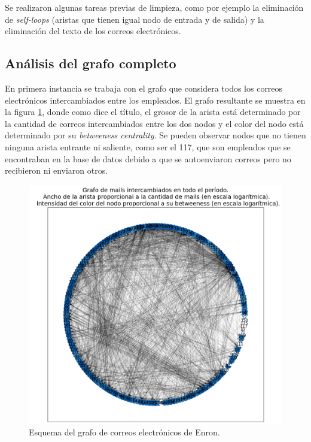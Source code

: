 \documentclass{article}
\begin{document}
Se realizaron algunas tareas previas de limpieza, como por ejemplo la eliminación de \textit{self-loops} (aristas que tienen igual nodo de entrada y de salida) y la eliminación del texto de los correos electrónicos.

\subsection{Análisis del grafo completo}
En primera instancia se trabaja con el grafo que considera todos los correos electrónicos intercambiados entre los empleados. El grafo resultante se muestra en la figura \ref{fig:grafo}, donde como dice el título, el grosor de la arista está determinado por la cantidad de correos intercambiados entre los dos nodos y el color del nodo está determinado por su \textit{betweeness centrality}. Se pueden observar nodos que no tienen ninguna arista entrante ni saliente, como ser el 117, que son empleados que se encontraban en la base de datos debido a que se autoenviaron correos pero no recibieron ni enviaron otros.

\begin{figure}[htb]
    \centering
    \includegraphics[width=0.8\linewidth]{imagenes/ej1/grafo.png}
    \caption{Esquema del grafo de correos electrónicos de Enron.}
    \label{fig:grafo}
\end{figure}
\end{document}
